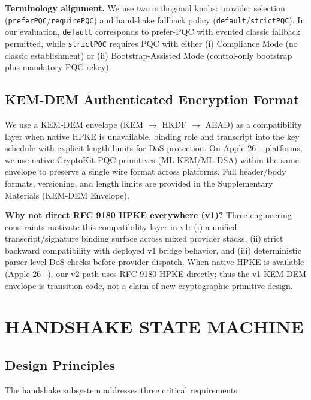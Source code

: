 \documentclass[10pt,journal,compsoc]{IEEEtran}
\begin{document}
\textbf{Terminology alignment.}
We use two orthogonal knobs: provider selection
(\texttt{preferPQC}/\texttt{requirePQC}) and handshake fallback policy
(\texttt{default}/\texttt{strictPQC}). In our evaluation, \texttt{default}
corresponds to prefer-PQC with evented classic fallback permitted, while
\texttt{strictPQC} requires PQC with either (i) Compliance Mode
(no classic establishment) or (ii) Bootstrap-Assisted Mode
(control-only bootstrap plus mandatory PQC rekey).

\subsection{KEM-DEM Authenticated Encryption
Format}\label{e.-kem-dem-authenticated-encryption-format}

We use a KEM-DEM envelope (KEM $\rightarrow$ HKDF $\rightarrow$ AEAD) as
a compatibility layer when native HPKE is unavailable, binding role and
transcript into the key schedule with explicit length limits for DoS
protection. On Apple 26+ platforms, we use native CryptoKit PQC
primitives (ML-KEM/ML-DSA) within the same envelope to preserve a single
wire format across platforms. Full header/body formats, versioning, and
length limits are provided in the Supplementary Materials (KEM-DEM
Envelope).

\textbf{Why not direct RFC 9180 HPKE everywhere (v1)?}
Three engineering constraints motivate this compatibility layer in v1:
(i) a unified transcript/signature binding surface across mixed
provider stacks, (ii) strict backward compatibility with deployed v1
bridge behavior, and (iii) deterministic parser-level DoS checks before
provider dispatch. When native HPKE is available (Apple 26+), our v2
path uses RFC 9180 HPKE directly; thus the v1 KEM-DEM envelope is
transition code, not a claim of new cryptographic primitive design.



\section{HANDSHAKE STATE
MACHINE}\label{sec:handshake-state-machine}

\subsection{Design Principles}\label{a.-design-principles}

The handshake subsystem addresses three critical requirements:
\end{document}
